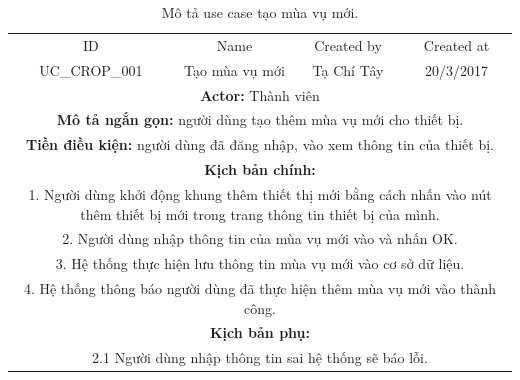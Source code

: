 \documentclass[a4paper,12pt,oneside]{article}
\begin{document}
\begin{table}[!htp]
\centering
\begin{tabularx}{\linewidth}{ |c||c|c|c| }
\hline
ID & Name & Created by & Created at\\
UC\_CROP\_001 & Tạo mùa vụ mới & Tạ Chí Tây & 20/3/2017\\
\hline
\multicolumn{4}{|X|}{\textbf{Actor:} Thành viên }\\
\hline
\multicolumn{4}{|X|}{\textbf{Mô tả ngắn gọn:} người dùng tạo thêm mùa vụ mới cho thiết bị. }\\
\hline
\multicolumn{4}{|X|}{\textbf{Tiền điều kiện:} người dùng đã đăng nhập, vào xem thông tin của thiết bị.}\\
\hline
\multicolumn{4}{|X|}{\textbf{Kịch bản chính:}}\\
\multicolumn{4}{|X|}{1. Người dùng khởi động khung thêm thiết thị mới bằng cách nhấn vào nút thêm thiết bị mới trong trang thông tin thiết bị của mình.}\\
\multicolumn{4}{|X|}{
2.	Người dùng nhập thông tin của mùa vụ mới vào và nhấn OK.}\\
\multicolumn{4}{|X|}{
3.	Hệ thống thực hiện lưu thông tin mùa vụ mới vào cơ sở dữ liệu.}\\
\multicolumn{4}{|X|}{
4. Hệ thống thông báo người dùng đã thực hiện thêm mùa vụ mới vào thành công.}\\
\hline
\multicolumn{4}{|X|}{\textbf{Kịch bản phụ:}}\\
\multicolumn{4}{|X|}{
2.1    Người dùng nhập thông tin sai hệ thống sẽ báo lỗi.}\\
\hline

\end{tabularx}
\caption{Mô tả use case tạo mùa vụ mới.}
\end{table}
\end{document}
